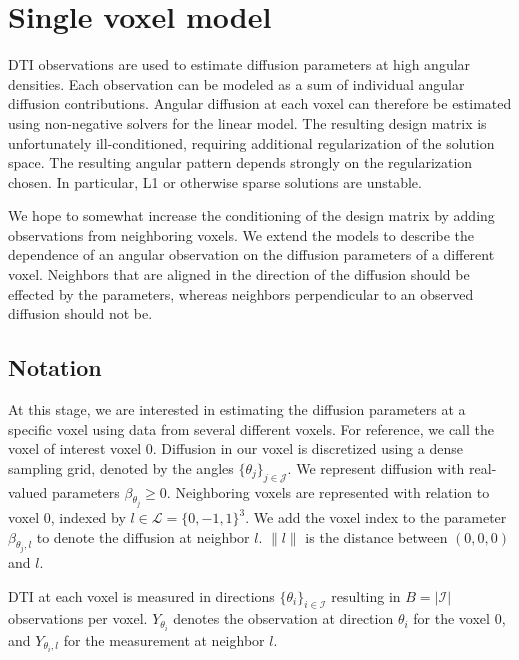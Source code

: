 \documentclass[11pt]{amsart}
\newcommand{\tj}{\theta_j}
\newcommand{\ti}{\theta_i}
\newcommand{\yti}{Y_{\theta_i}}
\newcommand{\ytil}{Y_{\theta_i,l}}
\begin{document}
\section{Single voxel model}
DTI observations are used to estimate diffusion parameters at high angular densities. 
Each observation can be modeled as a sum of individual angular diffusion contributions. 
Angular diffusion at each voxel can therefore be estimated using non-negative solvers for the linear model. 
The resulting design matrix is unfortunately ill-conditioned, requiring additional regularization of the solution space. 
The resulting angular pattern depends strongly on the regularization chosen. 
In particular, L1 or otherwise sparse solutions are unstable. 

We hope to somewhat increase the conditioning of the design matrix by adding observations 
from neighboring voxels. We extend the models to describe the dependence of 
an angular observation on the diffusion parameters of a different voxel. Neighbors 
that are aligned in the direction of the diffusion should be effected by the parameters,  
whereas neighbors perpendicular to an observed diffusion should not be. 

\subsection{Notation}

At this stage, we are interested in estimating the diffusion parameters at a 
specific voxel using data from several different voxels. 
For reference, we call the voxel of interest voxel 0. 
Diffusion in our voxel is discretized using a dense sampling grid, denoted by
the angles $\{\tj\}_{j \in \mathcal{J}}$. 
We represent diffusion with real-valued parameters $\beta_{\tj}\geq 0$.
Neighboring voxels are represented with relation to voxel $0$, indexed by $l \in \mathcal{L} = \{0,-1,1\}^3$. 
We add the voxel index to the parameter $\beta_{\tj, l}$ to denote the diffusion at neighbor $l$. 
$\|l\|$ is the distance between $(0,0,0)$ and $l$.

DTI at each voxel is measured in directions $\{\ti\}_{ i \in \mathcal{I}}$ resulting in  $B = |\mathcal{I}| $ observations per voxel.  
$\yti$ denotes the observation at direction $\ti$ for the voxel 0, and $\ytil$ for the 
measurement at neighbor $l$. 
\end{document}
